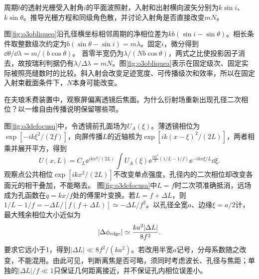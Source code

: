 \begin{exercise}\label{ex:o3oblique}
周期$b$的透射光栅受入射角$i$的平面波照射，入射和出射横向波矢分别为$k\sin i$、$k\sin\theta$。推导光栅方程和同级角色散，并讨论入射角是否直接改变$mN$。
\end{exercise}
\begin{solution}
图\ref{fig:o3obliqueq}沿孔径横坐标相邻周期的净相位差为$kb(\sin i-\sin\theta)$。相长条件取整数级次约定为$b(\sin\theta-\sin i)=m\lambda$。固定$i$，微分得到$\dd\theta/\dd\lambda=m/(b\cos\theta)$。
首零半宽仍为$\lambda/(Nb\cos\theta)$，两式之比使投影因子消去，故按瑞利判据仍有$\lambda/\Delta\lambda=mN$。图\ref{fig:o3obliquea}表示在固定级次、固定实际被照亮缝数时的比较。斜入射会改变足迹宽度、可传播级次和效率，所以在固定入射束截面条件下，$N$本身可能改变。
\end{solution}

\begin{exercise}\label{ex:o3defocus}
在夫琅禾费装置中，观察屏偏离透镜后焦面。为什么衍射场重新出现孔径二次相位？以一维自由传播说明保留哪些项。
\end{exercise}
\begin{solution}
图\ref{fig:o3defocusq}中，令透镜前孔面场为$U_A(\xi)$。薄透镜相位为$\exp[-ik\xi^2/(2f)]$，向屏传播$L$的近轴核为$\exp[ik(x-\xi)^2/(2L)]$，两者相乘并展开平方，得到
\[
 U(x,L)=C_L\ee^{ikx^2/(2L)}\int U_A(\xi)
 \ee^{\frac{ik\xi^2}{2}(1/L-1/f)}\ee^{-ikx\xi/L}\dd\xi.
\]
观察点公共相位$\exp[ikx^2/(2L)]$不改变单点强度，孔径内的二次相位却改变各面元的相干叠加，不能略去。
图\ref{fig:o3defocusa}中$L=f$时二次项准确抵消，远场成为孔函数在$q=kx/f$处的傅里叶变换。若$L=f+\Delta L$，则$1/L-1/f=-\Delta L/[f(f+\Delta L)]\simeq-\Delta L/f^2$。以孔径全宽$a$、边缘$\xi=a/2$计，最大残余相位大小近似为
\[
 |\Delta\phi_{\rm edge}|\simeq\frac{k a^2|\Delta L|}{8f^2}.
\]
要求它远小于1，得到$|\Delta L|\ll8f^2/(ka^2)$。若改用半宽$a$记号，分母系数随之改变，不能混用。由此可见，判断离焦是否可略，须同时考虑波长、孔径与焦距；单独的$|\Delta L|/f\ll1$只保证几何距离接近，并不保证孔内相位误差小。
\end{solution}

